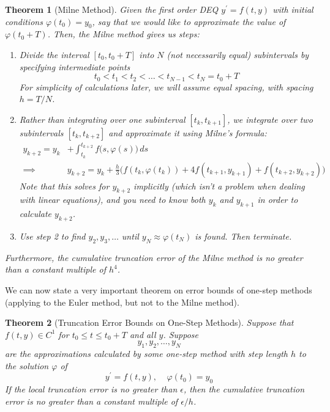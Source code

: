 \documentclass{article}
\newtheorem{theorem}{Theorem}[section]
\theoremstyle{remark}
\theoremstyle{definition}
\begin{document}
    \begin{theorem}[Milne Method]
    Given the first order DEQ $y^\prime = f(t, y)$ with initial conditions $\varphi(t_0) = y_0$, say that we would like to approximate the value of $\varphi(t_0 + T)$. Then, the \textit{Milne method} gives us steps: 
    \begin{enumerate}
        \item Divide the interval $[t_0, t_0 + T]$ into $N$ (not necessarily equal) subintervals by specifying intermediate points 
        \[t_0 < t_1 < t_2 < \ldots < t_{N-1} < t_N = t_0 + T\]
        For simplicity of calculations later, we will assume equal spacing, with spacing $h = T/N$. 
        \item Rather than integrating over one subinterval $[t_k, t_{k+1}]$, we integrate over two subintervals $[t_k, t_{k+2}]$ and approximate it using Milne's formula:
        \begin{align*}
            y_{k+2} = y_k & + \int_{t_k}^{t_{k+2}} f\big(s, \varphi(s)\big)\,ds \\
            \implies & y_{k+2} = y_k + \frac{h}{3} \big( f(t_k, \varphi(t_k)) + 4 f (t_{k+1}, y_{k+1}) + f(t_{k+2}, y_{k+2})\big)
        \end{align*}
        Note that this solves for $y_{k+2}$ implicitly (which isn't a problem when dealing with linear equations), and you need to know both $y_k$ and $y_{k+1}$ in order to calculate $y_{k+2}$. 
        \item Use step 2 to find $y_2, y_3, \ldots$ until $y_N \approx \varphi(t_N)$ is found. Then terminate. 
    \end{enumerate}
    Furthermore, the cumulative truncation error of the Milne method is no greater than a constant multiple of $h^4$. 
    \end{theorem}

    We can now state a very important theorem on error bounds of one-step methods (applying to the Euler method, but not to the Milne method). 

    \begin{theorem}[Truncation Error Bounds on One-Step Methods]
    Suppose that $f(t, y) \in C^1$ for $t_0 \leq t \leq t_0 + T$ and all $y$. Suppose 
    \[y_1, y_2, \ldots, y_N\]
    are the approximations calculated by some one-step method with step length $h$ to the solution $\varphi$ of 
    \[y^\prime = f(t, y), \;\;\;\; \varphi(t_0) = y_0\]
    If the local truncation error is no greater than $\epsilon$, then the cumulative truncation error is no greater than a constant multiple of $\epsilon/h$. 
    \end{theorem}
\end{document}
